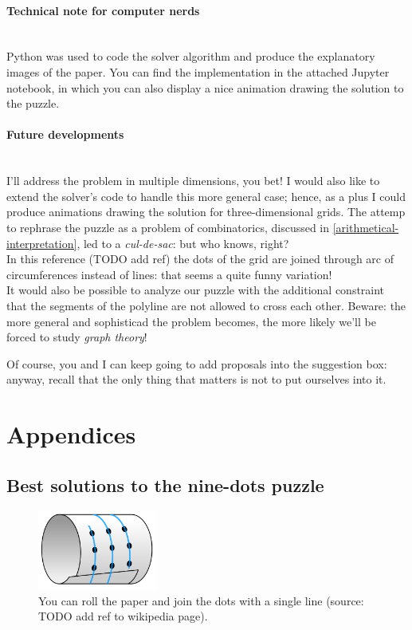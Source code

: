 \documentclass[11pt]{article}
\begin{document}
\paragraph{Technical note for computer nerds} \mbox{} \\
Python was used to code the solver algorithm and produce the explanatory images of the paper. You can find the implementation in the attached Jupyter notebook, in which you can also display a nice animation drawing the solution to the puzzle.

\paragraph{Future developments} \mbox{} \\
I'll address the problem in multiple dimensions, you bet! I would also like to extend the solver's code to handle this more general case; hence, as a plus I could produce animations drawing the solution for three-dimensional grids. The attemp to rephrase the puzzle as a problem of combinatorics, discussed in \autoref{arithmetical-interpretation}, led to a \emph{cul-de-sac}: but who knows, right?\\
In this reference (TODO add ref) the dots of the grid are joined through arc of circumferences instead of lines: that seems a quite funny variation!\\
It would also be possible to analyze our puzzle with the additional constraint that the segments of the polyline are not allowed to cross each other. Beware: the more general and sophisticad the problem becomes, the more likely we'll be forced to study \emph{graph theory}!

Of course, you and I can keep going to add proposals into the suggestion box: anyway, recall that the only thing that matters is not to put ourselves into it.

\hypertarget{appendices}{
	\section{Appendices}
	\label{appendices}
}

\hypertarget{best-solutions-nine-dots-puzzle} {
	\subsection{Best solutions to the nine-dots puzzle}
	\label{best-solutions-nine-dots-puzzle}
}

\begin{figure}
\includegraphics[width=0.35\textwidth]{images/nine-dots-roll-paper.png}
\caption{You can roll the paper and join the dots with a single line (source: TODO add ref to wikipedia page).}
\label{nine-dots-roll-paper}
\end{figure}
\end{document}
